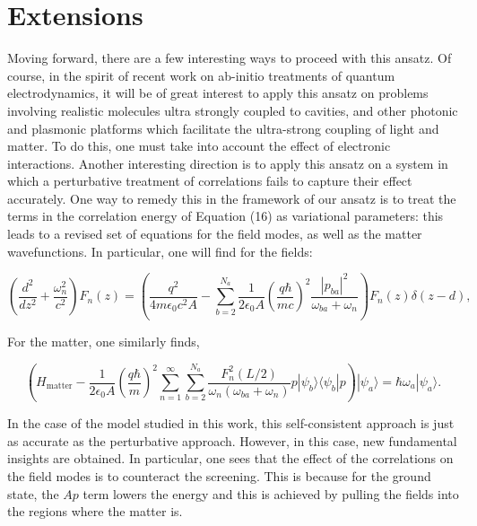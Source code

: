 \documentclass[aps,prb,twocolumn,
	groupedaddress,superscriptaddress,
	amsfonts,amssymb,amsmath,floatfix,
	citeautoscript]{revtex4-1}
\begin{document}
\section{Extensions}
Moving forward, there are a few interesting ways to proceed with this ansatz. Of course, in the spirit of recent work on ab-initio treatments of quantum electrodynamics, it will be of great interest to apply this ansatz on problems involving realistic molecules ultra strongly coupled to cavities, and other photonic and plasmonic platforms which facilitate the ultra-strong coupling of light and matter. To do this, one must take into account the effect of electronic interactions. Another interesting direction is to apply this ansatz on a system in which a perturbative treatment of correlations fails to capture their effect accurately. One way to remedy this in the framework of our ansatz is to treat the terms in the correlation energy of Equation (16) as variational parameters: this leads to a revised set of equations for the field modes, as well as the matter wavefunctions. In particular, one will find for the fields:
\begin{widetext}
\begin{equation*}
\left(\frac{d^2}{dz^2} + \frac{\omega_n^2}{c^2} \right)F_n(z) = \left(\frac{q^2}{4m\epsilon_0 c^2 A} - \sum\limits_{b=2}^{N_a}\frac{1}{2\epsilon_0 A}\left( \frac{q\hbar}{mc}\right)^2\frac{|p_{ba}|^2}{\omega_{ba}+\omega_n}\right)F_n(z)\delta(z-d),
\end{equation*}
\end{widetext}
For the matter, one similarly finds,
\begin{widetext}
\begin{equation*}
\left(H_{\mathrm{matter}} - \frac{1}{2\epsilon_0 A}\left(\frac{q\hbar}{m}\right)^2\sum\limits_{n=1}^{\infty}\sum\limits_{b=2}^{N_a}\frac{F^2_n(L/2)}{\omega_n(\omega_{ba}+\omega_n)}p|\psi_b\rangle\langle \psi_b|p\right)|\psi_a\rangle = \hbar\omega_a|\psi_a\rangle.
\end{equation*}
\end{widetext}
In the case of the model studied in this work, this self-consistent approach is just as accurate as the perturbative approach. However, in this case, new fundamental insights are obtained. In particular, one sees that the effect of the correlations on the field modes is to counteract the screening. This is because for the ground state, the $Ap$ term lowers the energy and this is achieved by pulling the fields into the regions where the matter is.
\end{document}
